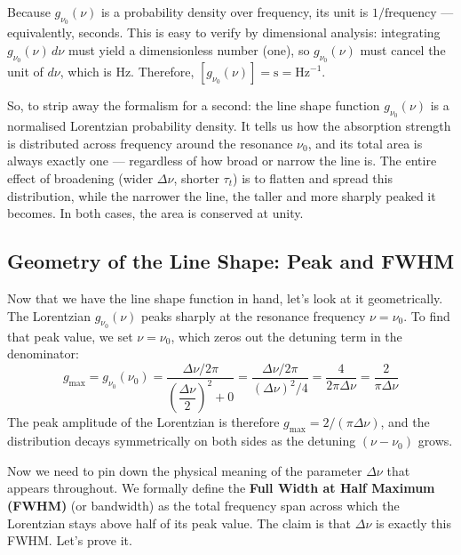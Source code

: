 \begin{keyinsight}
    Because $g_{\nu_0}(\nu)$ is a probability density over frequency, its unit is $1/\text{frequency}$ — equivalently, seconds. This is easy to verify by dimensional analysis: integrating $g_{\nu_0}(\nu)\,d\nu$ must yield a dimensionless number (one), so $g_{\nu_0}(\nu)$ must cancel the unit of $d\nu$, which is Hz. Therefore, $[g_{\nu_0}(\nu)] = \text{s} = \text{Hz}^{-1}$.
\end{keyinsight}

So, to strip away the formalism for a second: the line shape function $g_{\nu_0}(\nu)$ is a normalised Lorentzian probability density. It tells us how the absorption strength is distributed across frequency around the resonance $\nu_0$, and its total area is always exactly one — regardless of how broad or narrow the line is. The entire effect of broadening (wider $\Delta\nu$, shorter $\tau_t$) is to flatten and spread this distribution, while the narrower the line, the taller and more sharply peaked it becomes. In both cases, the area is conserved at unity.

\subsection{Geometry of the Line Shape: Peak and FWHM}

Now that we have the line shape function in hand, let's look at it geometrically. The Lorentzian $g_{\nu_0}(\nu)$ peaks sharply at the resonance frequency $\nu = \nu_0$. To find that peak value, we set $\nu = \nu_0$, which zeros out the detuning term in the denominator:
\begin{equation*}
    g_{\max} = g_{\nu_0}(\nu_0) = \frac{\Delta\nu/2\pi}{\left(\dfrac{\Delta\nu}{2}\right)^2 + 0} = \frac{\Delta\nu/2\pi}{(\Delta\nu)^2/4} = \frac{4}{2\pi\Delta\nu} = \frac{2}{\pi\Delta\nu}
\end{equation*}
The peak amplitude of the Lorentzian is therefore $g_{\max} = 2/(\pi\Delta\nu)$, and the distribution decays symmetrically on both sides as the detuning $(\nu - \nu_0)$ grows.

Now we need to pin down the physical meaning of the parameter $\Delta\nu$ that appears throughout. We formally define the \textbf{Full Width at Half Maximum (FWHM)} (or bandwidth) as the total frequency span across which the Lorentzian stays above half of its peak value. The claim is that $\Delta\nu$ is exactly this FWHM. Let's prove it.

